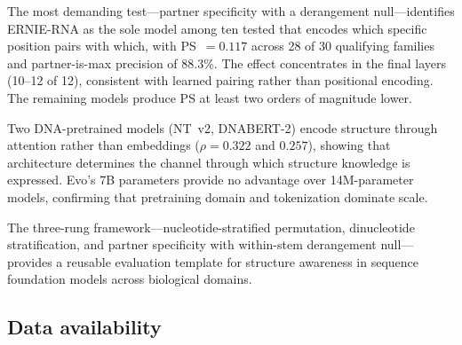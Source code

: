 \documentclass[11pt]{article}
\begin{document}
The most demanding test---partner specificity with a derangement
null---identifies ERNIE-RNA as the sole model among ten tested that
encodes which specific position pairs with which, with PS~$= 0.117$
across 28 of 30 qualifying families and partner-is-max precision of
88.3\%.  The effect concentrates in the final layers (10--12 of 12),
consistent with learned pairing rather than positional encoding.  The
remaining models produce PS at least two orders of magnitude lower.

Two DNA-pretrained models (NT~v2, DNABERT-2) encode structure through
attention rather than embeddings ($\rho = 0.322$ and $0.257$),
showing that architecture determines the channel through which
structure knowledge is expressed.  Evo's 7B parameters provide no
advantage over 14M-parameter models, confirming that pretraining
domain and tokenization dominate scale.

The three-rung framework---nucleotide-stratified permutation,
dinucleotide stratification, and partner specificity with within-stem
derangement null---provides a reusable evaluation template for
structure awareness in sequence foundation models across biological
domains.

\subsection*{Data availability}
\end{document}
